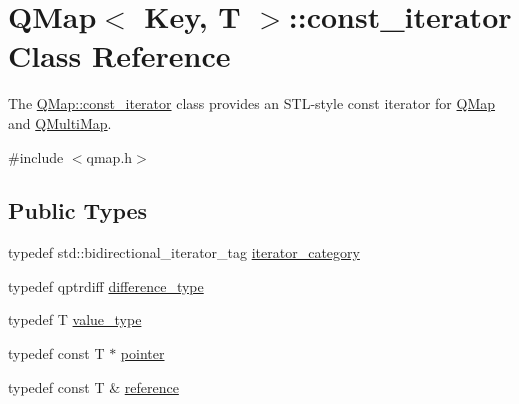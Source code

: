 \hypertarget{class_q_map_1_1const__iterator}{}\section{Q\+Map$<$ Key, T $>$\+:\+:const\+\_\+iterator Class Reference}
\label{class_q_map_1_1const__iterator}


The \hyperlink{class_q_map_1_1const__iterator}{Q\+Map\+::const\+\_\+iterator} class provides an S\+T\+L-\/style const iterator for \hyperlink{class_q_map}{Q\+Map} and \hyperlink{class_q_multi_map}{Q\+Multi\+Map}.  




{\ttfamily \#include $<$qmap.\+h$>$}

\subsection*{Public Types}
\begin{DoxyCompactItemize}
\item 
typedef std\+::bidirectional\+\_\+iterator\+\_\+tag \hyperlink{class_q_map_1_1const__iterator_a79928cf33eb28c75816c043713618cc8}{iterator\+\_\+category}
\item 
typedef qptrdiff \hyperlink{class_q_map_1_1const__iterator_a7e5b2d0b217016d40d7b3577bc1f7f16}{difference\+\_\+type}
\item 
typedef T \hyperlink{class_q_map_1_1const__iterator_aaa29e11138ea801c77d9737936527220}{value\+\_\+type}
\item 
typedef const T $\ast$ \hyperlink{class_q_map_1_1const__iterator_abbd1b2800284c6c885a8e749639a0e61}{pointer}
\item 
typedef const T \& \hyperlink{class_q_map_1_1const__iterator_adefe695a7ddf7c62989d632d1f7e7ccb}{reference}
\end{DoxyCompactItemize}
